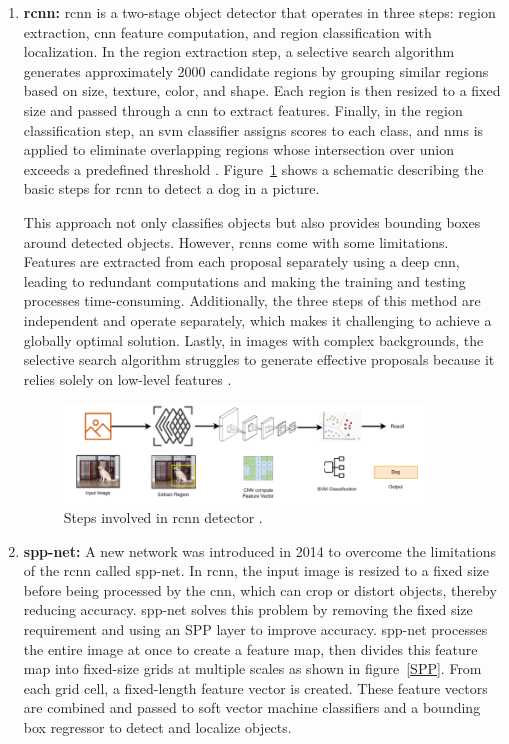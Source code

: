 \begin{enumerate}
    \item \textbf{\gls{rcnn}:} \gls{rcnn} is a two-stage object detector that operates in three steps: region extraction, \gls{cnn} feature computation, and region classification with localization. In the region extraction step, a selective search algorithm generates approximately 2000 candidate regions by grouping similar regions based on size, texture, color, and shape. Each region is then resized to a fixed size and passed through a \gls{cnn} to extract features. Finally, in the region classification step, an \gls{svm} classifier assigns scores to each class, and \gls{nms} is applied to eliminate overlapping regions whose intersection over union exceeds a predefined threshold \cite{oD_Review}. Figure~\ref{RCNN} shows a schematic describing the basic steps for \gls{rcnn} to detect a dog in a picture.

    This approach not only classifies objects but also provides bounding boxes around detected objects. However, \gls{rcnn}s come with some limitations. Features are extracted from each proposal separately using a deep \gls{cnn}, leading to redundant computations and making the training and testing processes time-consuming. Additionally, the three steps of this method are independent and operate separately, which makes it challenging to achieve a globally optimal solution. Lastly, in images with complex backgrounds, the selective search algorithm struggles to generate effective proposals because it relies solely on low-level features \cite{oD_Review}.
    
    \begin{figure}[ht]
        \centering
        \includegraphics[width=0.9\textwidth]{Figures/RCNN.PNG} 
        \caption{Steps involved in \gls{rcnn} detector \cite{oD_Review}.}
        \label{RCNN}
    \end{figure}
    
    \item \textbf{\gls{spp-net}:} A new network was introduced in 2014 to overcome the limitations of the \gls{rcnn} called \gls{spp-net}. In \gls{rcnn}, the input image is resized to a fixed size before being processed by the \gls{cnn}, which can crop or distort objects, thereby reducing accuracy. \gls{spp-net} solves this problem by removing the fixed size requirement and using an SPP layer to improve accuracy. \gls{spp-net} processes the entire image at once to create a feature map, then divides this feature map into fixed-size grids at multiple scales as shown in figure~\ref{SPP}. From each grid cell, a fixed-length feature vector is created. These feature vectors are combined and passed to soft vector machine classifiers and a bounding box regressor to detect and localize objects.
    

\end{enumerate}
